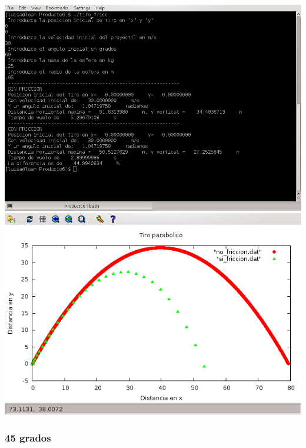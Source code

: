 \documentclass[10pt]{article}
\begin{document}
\includegraphics[scale=0.6]{60grad.png}
\\
\includegraphics[scale=0.6]{60graf.png}

\newpage

\subsubsection{45 grados}
\end{document}
